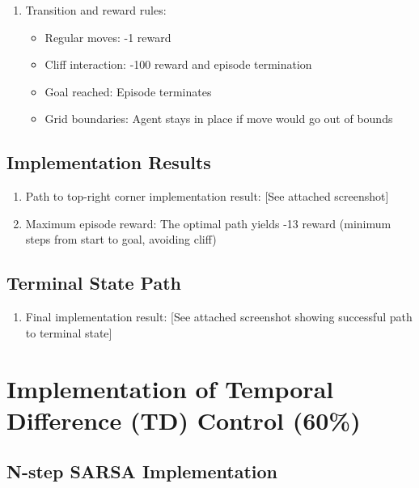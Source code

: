 \documentclass{article}
\begin{document}
\begin{enumerate}[label=(\arabic*)]
\item Transition and reward rules:
\begin{itemize}
    \item Regular moves: -1 reward
    \item Cliff interaction: -100 reward and episode termination
    \item Goal reached: Episode terminates
    \item Grid boundaries: Agent stays in place if move would go out of bounds
\end{itemize}
\end{enumerate}

\subsection{Implementation Results}
\begin{enumerate}[label=(\arabic*)]
\item Path to top-right corner implementation result: [See attached screenshot]

\item Maximum episode reward:
The optimal path yields -13 reward (minimum steps from start to goal, avoiding cliff)
\end{enumerate}

\subsection{Terminal State Path}
\begin{enumerate}[label=(\arabic*)]
\item Final implementation result: [See attached screenshot showing successful path to terminal state]
\end{enumerate}

\section{Implementation of Temporal Difference (TD) Control (60\%)}

\subsection{N-step SARSA Implementation}
\end{document}
